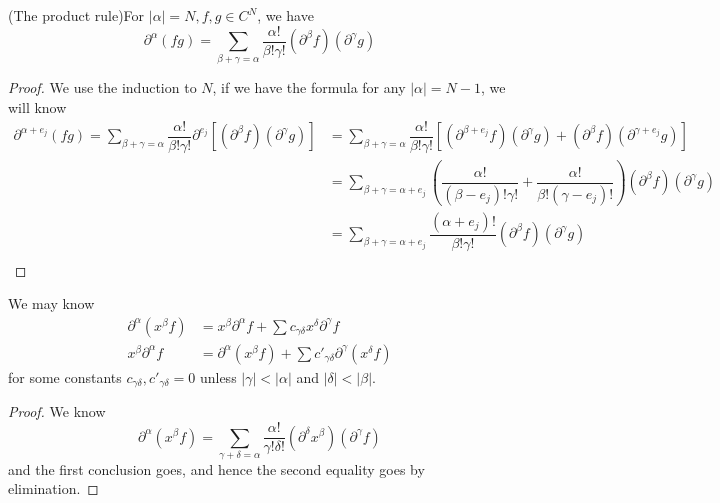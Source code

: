 \documentclass[lang=en, color=blue, ]{elegantbook}
\begin{document}
\begin{proposition}
    (The product rule)For $|\alpha| = N, f,g\in C^N$, we have
    \[
    \partial^{\alpha}(fg) = \sum\limits_{\beta + \gamma = \alpha}\dfrac{\alpha!}{\beta!\gamma!}(\partial^{\beta}f)(\partial^{\gamma}g)
    \]
\end{proposition}
\begin{proof}
    We use the induction to $N$, if we have the formula for any $|\alpha| = N-1$, we will know
    \[
    \begin{aligned}
    \partial^{\alpha+e_j}(fg) = \sum\limits_{\beta + \gamma = \alpha}\dfrac{\alpha!}{\beta!\gamma!}\partial^{e_j}[(\partial^{\beta}f)(\partial^{\gamma}g)]  &= \sum\limits_{\beta + \gamma = \alpha}\dfrac{\alpha!}{\beta!\gamma!}[(\partial^{\beta+e_j}f)(\partial^{\gamma}g)+(\partial^{\beta}f)(\partial^{\gamma+e_j}g)] \\
    & = \sum\limits_{\beta + \gamma = \alpha+e_j}(\dfrac{\alpha!}{(\beta-e_j)!\gamma!}+\dfrac{\alpha!}{\beta!(\gamma-e_j)!})(\partial^{\beta}f)(\partial^{\gamma}g) \\
    & = \sum\limits_{\beta + \gamma = \alpha+e_j}\dfrac{(\alpha+e_j)!}{\beta!\gamma!}(\partial^{\beta}f)(\partial^{\gamma}g) \\
    \end{aligned}
    \]
\end{proof}

\begin{corollary}
    We may know
    \[
    \begin{aligned}
        \partial^{\alpha}(x^{\beta}f) &= x^{\beta}\partial^{\alpha}f + \sum c_{\gamma\delta}x^{\delta}\partial^{\gamma}f \\
        x^{\beta}\partial^{\alpha}f &= \partial^{\alpha}(x^{\beta}f) + \sum c'_{\gamma\delta}\partial^{\gamma}(x^{\delta}f)
    \end{aligned}
    \]
    for some constants $c_{\gamma\delta},c'_{\gamma\delta} = 0$ unless $|\gamma|<|\alpha|$ and $|\delta|<|\beta|$.
\end{corollary}
\begin{proof}
    We know
    \[
    \partial^{\alpha}(x^{\beta}f) = \sum\limits_{\gamma + \delta = \alpha}\dfrac{\alpha!}{\gamma!\delta!}(\partial^{\delta}x^{\beta})(\partial^{\gamma}f)
    \]
    and the first conclusion goes, and hence the second equality goes by elimination.
\end{proof}
\end{document}
